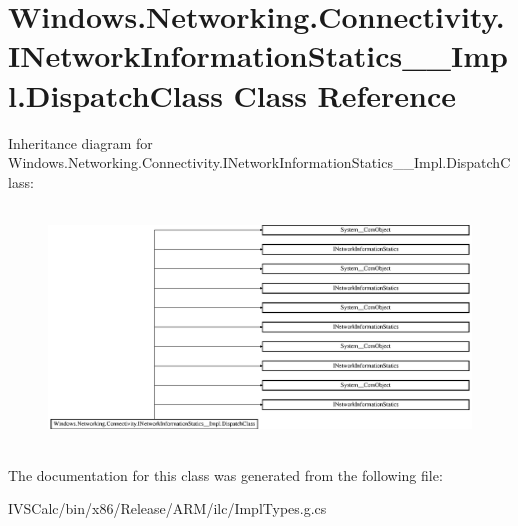 \hypertarget{class_windows_1_1_networking_1_1_connectivity_1_1_i_network_information_statics_____impl_1_1_dispatch_class}{}\section{Windows.\+Networking.\+Connectivity.\+I\+Network\+Information\+Statics\+\_\+\+\_\+\+Impl.\+Dispatch\+Class Class Reference}
\label{class_windows_1_1_networking_1_1_connectivity_1_1_i_network_information_statics_____impl_1_1_dispatch_class}
Inheritance diagram for Windows.\+Networking.\+Connectivity.\+I\+Network\+Information\+Statics\+\_\+\+\_\+\+Impl.\+Dispatch\+Class\+:\begin{figure}[H]
\begin{center}
\leavevmode
\includegraphics[height=6.376812cm]{class_windows_1_1_networking_1_1_connectivity_1_1_i_network_information_statics_____impl_1_1_dispatch_class}
\end{center}
\end{figure}


The documentation for this class was generated from the following file\+:\begin{DoxyCompactItemize}
\item 
I\+V\+S\+Calc/bin/x86/\+Release/\+A\+R\+M/ilc/Impl\+Types.\+g.\+cs\end{DoxyCompactItemize}
